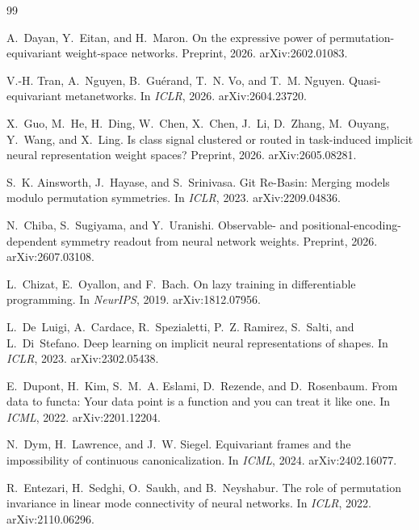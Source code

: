 \begin{thebibliography}{99}

A.~Dayan, Y.~Eitan, and H.~Maron.
\newblock On the expressive power of permutation-equivariant weight-space networks.
\newblock Preprint, 2026. arXiv:2602.01083.

V.-H. Tran, A.~Nguyen, B.~Gu\'erand, T.~N. Vo, and T.~M. Nguyen.
\newblock Quasi-equivariant metanetworks.
\newblock In \emph{ICLR}, 2026. arXiv:2604.23720.

X.~Guo, M.~He, H.~Ding, W.~Chen, X.~Chen, J.~Li, D.~Zhang, M.~Ouyang, Y.~Wang, and X.~Ling.
\newblock Is class signal clustered or routed in task-induced implicit neural representation
weight spaces?
\newblock Preprint, 2026. arXiv:2605.08281.


S.~K. Ainsworth, J.~Hayase, and S.~Srinivasa.
\newblock Git Re-Basin: Merging models modulo permutation symmetries.
\newblock In \emph{ICLR}, 2023. arXiv:2209.04836.

N.~Chiba, S.~Sugiyama, and Y.~Uranishi.
\newblock Observable- and positional-encoding-dependent symmetry readout from neural network
  weights.
\newblock Preprint, 2026. arXiv:2607.03108.

L.~Chizat, E.~Oyallon, and F.~Bach.
\newblock On lazy training in differentiable programming.
\newblock In \emph{NeurIPS}, 2019. arXiv:1812.07956.

L.~De~Luigi, A.~Cardace, R.~Spezialetti, P.~Z. Ramirez, S.~Salti, and L.~Di~Stefano.
\newblock Deep learning on implicit neural representations of shapes.
\newblock In \emph{ICLR}, 2023. arXiv:2302.05438.

E.~Dupont, H.~Kim, S.~M.~A. Eslami, D.~Rezende, and D.~Rosenbaum.
\newblock From data to functa: Your data point is a function and you can treat it like one.
\newblock In \emph{ICML}, 2022. arXiv:2201.12204.

N.~Dym, H.~Lawrence, and J.~W. Siegel.
\newblock Equivariant frames and the impossibility of continuous canonicalization.
\newblock In \emph{ICML}, 2024. arXiv:2402.16077.

R.~Entezari, H.~Sedghi, O.~Saukh, and B.~Neyshabur.
\newblock The role of permutation invariance in linear mode connectivity of neural networks.
\newblock In \emph{ICLR}, 2022. arXiv:2110.06296.


\end{thebibliography}
